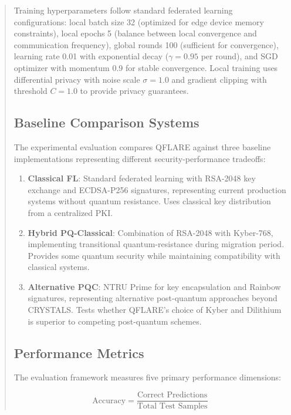 \documentclass{svproc}
\begin{document}
\begin{abstract}
Training hyperparameters follow standard federated learning configurations: local batch size 32 (optimized for edge device memory constraints), local epochs 5 (balance between local convergence and communication frequency), global rounds 100 (sufficient for convergence), learning rate 0.01 with exponential decay ($\gamma = 0.95$ per round), and SGD optimizer with momentum 0.9 for stable convergence. Local training uses differential privacy with noise scale $\sigma = 1.0$ and gradient clipping with threshold $C = 1.0$ to provide privacy guarantees.

\subsection{Baseline Comparison Systems}

The experimental evaluation compares QFLARE against three baseline implementations representing different security-performance tradeoffs:

\begin{enumerate}
    \item \textbf{Classical FL}: Standard federated learning with RSA-2048 key exchange and ECDSA-P256 signatures, representing current production systems without quantum resistance. Uses classical key distribution from a centralized PKI.
    \item \textbf{Hybrid PQ-Classical}: Combination of RSA-2048 with Kyber-768, implementing transitional quantum-resistance during migration period. Provides some quantum security while maintaining compatibility with classical systems.
    \item \textbf{Alternative PQC}: NTRU Prime for key encapsulation and Rainbow signatures, representing alternative post-quantum approaches beyond CRYSTALS. Tests whether QFLARE's choice of Kyber and Dilithium is superior to competing post-quantum schemes.
\end{enumerate}

\subsection{Performance Metrics}

The evaluation framework measures five primary performance dimensions:

\begin{equation}
\text{Accuracy} = \frac{\text{Correct Predictions}}{\text{Total Test Samples}}
\end{equation}


\end{abstract}
\end{document}
